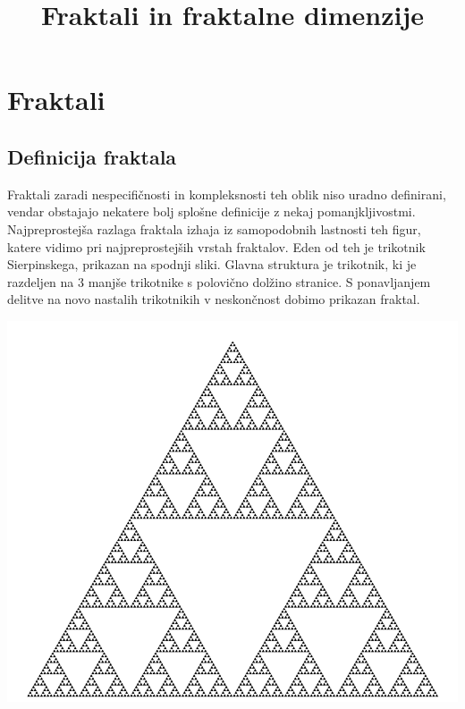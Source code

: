 \documentclass[a4paper, 12px]{article}
\title{Fraktali in fraktalne dimenzije}
\begin{document}
\maketitle
\tableofcontents

\section{Fraktali}
    \subsection{Definicija fraktala}
        Fraktali zaradi nespecifičnosti in kompleksnosti teh oblik niso uradno definirani, vendar obstajajo nekatere bolj splošne definicije z nekaj pomanjkljivostmi.
        Najpreprostejša razlaga fraktala izhaja iz samopodobnih lastnosti teh figur, katere vidimo pri najpreprostejših vrstah fraktalov. 
        Eden od teh je trikotnik Sierpinskega, prikazan na spodnji sliki. Glavna struktura je trikotnik, ki je razdeljen na 3 manjše trikotnike s polovično dolžino stranice. 
        S ponavljanjem delitve na novo nastalih trikotnikih v neskončnost dobimo prikazan fraktal.
        \cite{FractalDefinitionVideo}
        \cite{FractalDefinition}\\
        \centerline{\includegraphics[scale=0.2]{sierpinski-triangle.png}}
        \begingroup
        \endgroup
\end{document}
